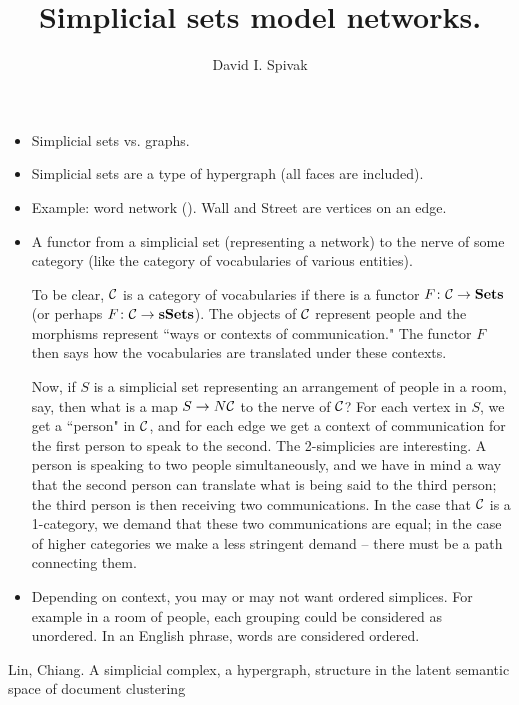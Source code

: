 \documentclass{amsart}
\begin{document}
\title{Simplicial sets model networks.}

\author{David I. Spivak}

\maketitle

\begin{itemize}

\item Simplicial sets vs. graphs.
\item Simplicial sets are a type of hypergraph (all faces are included).
\item Example: word network (\cite{LC}).  Wall and Street are vertices on an edge.
\item A functor from a simplicial set (representing a network) to the nerve of some category (like the category of vocabularies of various entities).  

To be clear, $\mathcal{C}$ is a category of vocabularies if there is a functor $F\colon\mathcal{C}\rightarrow{\bf Sets}$ (or perhaps $F\colon\mathcal{C}\rightarrow{\bf sSets}$).  The objects of $\mathcal{C}$ represent people and the morphisms represent ``ways or contexts of communication."  The functor $F$ then says how the vocabularies are translated under these contexts.  

Now, if $S$ is a simplicial set representing an arrangement of people in a room, say, then what is a map $S\rightarrow N\mathcal{C}$ to the nerve of $\mathcal{C}$?  For each vertex in $S$, we get a ``person" in $\mathcal{C}$, and for each edge we get a context of communication for the first person to speak to the second.  The 2-simplicies are interesting.  A person is speaking to two people simultaneously, and we have in mind a way that the second person can translate what is being said to the third person; the third person is then receiving two communications.  In the case that $\mathcal{C}$ is a 1-category, we demand that these two communications are equal; in the case of higher categories we make a less stringent demand -- there must be a path connecting them.

\item Depending on context, you may or may not want ordered simplices.  For example in a room of people, each grouping could be considered as unordered.  In an English phrase, words are considered ordered.

\end{itemize}


\begin{thebibliography}{JTT}

 Lin, Chiang.  A simplicial complex, a hypergraph,
structure in the latent semantic space
of document clustering

\end{thebibliography}
\end{document}
